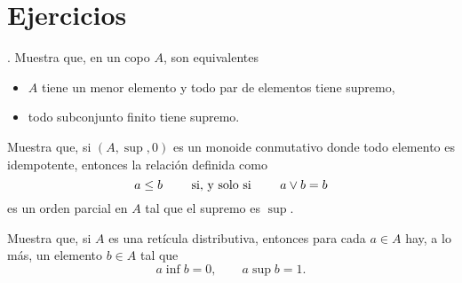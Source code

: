 \section{Ejercicios}

\begin{exercise} \label{exe:equiv-1-def-sup-poset}.
  Muestra que, en un copo $A$, son equivalentes
  \begin{itemize}
    \item
      $A$ tiene un menor elemento y todo par de elementos tiene
      supremo,
    \item
      todo subconjunto finito tiene supremo.
  \end{itemize}
\end{exercise}

\begin{exercise}
  \label{exe:monoide-conmutativo-equiv-sup-pos}
  Muestra que, si $(A,\sup,0)$ es un monoide conmutativo donde todo
  elemento es idempotente, entonces la relación definida como
  \[
    a\leq b \qquad\text{ si, y solo si }\qquad a\vee b=b
  \]
  es un orden parcial en $A$ tal que el supremo es $\sup$.
\end{exercise}

\begin{exercise}\label{exe:dist-unicidad-complementos}
  Muestra que, si $A$ es una retícula distributiva, entonces para cada
  $a\in A$ hay, a lo más, un elemento $b\in A$ tal que
  \begin{equation}
    a\inf b = 0, \qquad a\sup b = 1.
  \end{equation}
\end{exercise}
